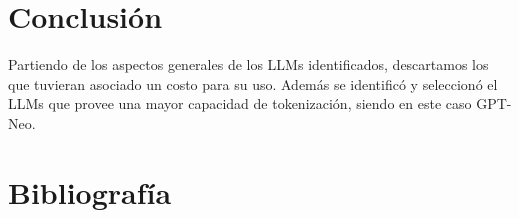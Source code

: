 \documentclass[journal,onecolumn]{IEEEtran}
\begin{document}
	\section{Conclusión}
	Partiendo de los aspectos generales de los LLMs identificados,  descartamos los que tuvieran asociado un costo para su uso. Además se identificó y seleccionó el LLMs que provee una mayor capacidad de tokenización, siendo en este caso GPT-Neo.
	
	\section{Bibliografía}
		\renewcommand\refname{Referencias}
	
	
	
\end{document}
